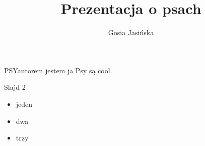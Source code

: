 \documentclass{beamer}
\title{Prezentacja o psach}
\author{Gosia Jasińska}
\institute{UG}
\begin{document}
  \maketitle
  \begin{frame}{PSY}{autorem jestem ja}
    Psy są cool.
  \end{frame}
  \begin{frame}{Slajd 2}
\begin{itemize}
  \item jeden \pause
  \item dwa \pause
  \item trzy \pause
\end{itemize}
  \end{frame}
\end{document}
